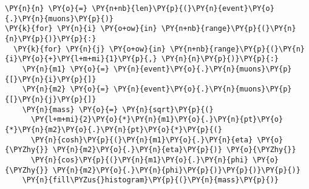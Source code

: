 \begin{Verbatim}[commandchars=\\\{\}]
\PY{n}{n} \PY{o}{=} \PY{n+nb}{len}\PY{p}{(}\PY{n}{event}\PY{o}{.}\PY{n}{muons}\PY{p}{)}
\PY{k}{for} \PY{n}{i} \PY{o+ow}{in} \PY{n+nb}{range}\PY{p}{(}\PY{n}{n}\PY{p}{)}\PY{p}{:}
  \PY{k}{for} \PY{n}{j} \PY{o+ow}{in} \PY{n+nb}{range}\PY{p}{(}\PY{n}{i}\PY{o}{+}\PY{l+m+mi}{1}\PY{p}{,} \PY{n}{n}\PY{p}{)}\PY{p}{:}
    \PY{n}{m1} \PY{o}{=} \PY{n}{event}\PY{o}{.}\PY{n}{muons}\PY{p}{[}\PY{n}{i}\PY{p}{]}
    \PY{n}{m2} \PY{o}{=} \PY{n}{event}\PY{o}{.}\PY{n}{muons}\PY{p}{[}\PY{n}{j}\PY{p}{]}
    \PY{n}{mass} \PY{o}{=} \PY{n}{sqrt}\PY{p}{(}
      \PY{l+m+mi}{2}\PY{o}{*}\PY{n}{m1}\PY{o}{.}\PY{n}{pt}\PY{o}{*}\PY{n}{m2}\PY{o}{.}\PY{n}{pt}\PY{o}{*}\PY{p}{(}
      \PY{n}{cosh}\PY{p}{(}\PY{n}{m1}\PY{o}{.}\PY{n}{eta} \PY{o}{\PYZhy{}} \PY{n}{m2}\PY{o}{.}\PY{n}{eta}\PY{p}{)} \PY{o}{\PYZhy{}}
      \PY{n}{cos}\PY{p}{(}\PY{n}{m1}\PY{o}{.}\PY{n}{phi} \PY{o}{\PYZhy{}} \PY{n}{m2}\PY{o}{.}\PY{n}{phi}\PY{p}{)}\PY{p}{)}\PY{p}{)}
    \PY{n}{fill\PYZus{}histogram}\PY{p}{(}\PY{n}{mass}\PY{p}{)}
\end{Verbatim}
